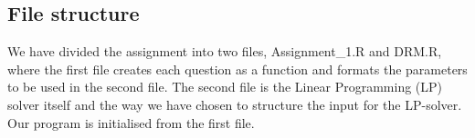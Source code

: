\documentclass{article}
\begin{document}






	\subsection{File structure}
	We have divided the assignment into two files, Assignment\_1.R and DRM.R, where the first file creates each question as a function and formats the parameters to be used in the second file. The second file is the Linear Programming (LP) solver itself and the way we have chosen to structure the input for the LP-solver. Our program is initialised from the first file.
\end{document}
